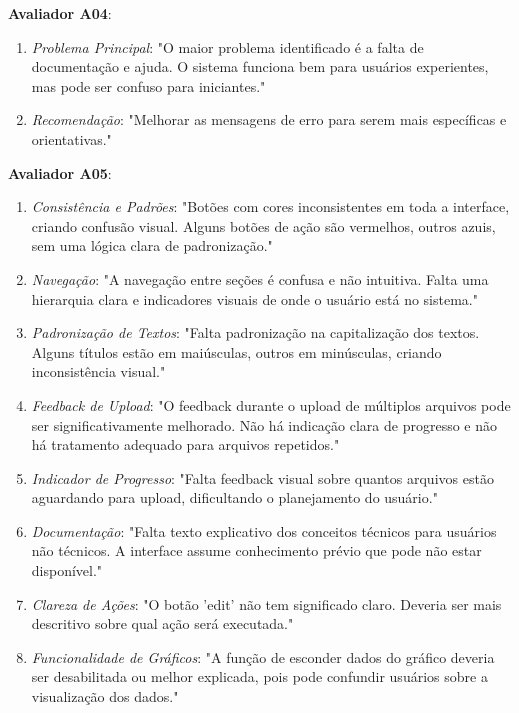 \textbf{Avaliador A04}:
\begin{enumerate}[parsep=0pt,itemsep=0pt]
    \item \textit{Problema Principal}: "O maior problema identificado é a falta de documentação e ajuda. O sistema funciona bem para usuários experientes, mas pode ser confuso para iniciantes."
    \item \textit{Recomendação}: "Melhorar as mensagens de erro para serem mais específicas e orientativas."
\end{enumerate}

\textbf{Avaliador A05}:
\begin{enumerate}[parsep=0pt,itemsep=0pt]
    \item \textit{Consistência e Padrões}: "Botões com cores inconsistentes em toda a interface, criando confusão visual. Alguns botões de ação são vermelhos, outros azuis, sem uma lógica clara de padronização."
    \item \textit{Navegação}: "A navegação entre seções é confusa e não intuitiva. Falta uma hierarquia clara e indicadores visuais de onde o usuário está no sistema."
    \item \textit{Padronização de Textos}: "Falta padronização na capitalização dos textos. Alguns títulos estão em maiúsculas, outros em minúsculas, criando inconsistência visual."
    \item \textit{Feedback de Upload}: "O feedback durante o upload de múltiplos arquivos pode ser significativamente melhorado. Não há indicação clara de progresso e não há tratamento adequado para arquivos repetidos."
    \item \textit{Indicador de Progresso}: "Falta feedback visual sobre quantos arquivos estão aguardando para upload, dificultando o planejamento do usuário."
    \item \textit{Documentação}: "Falta texto explicativo dos conceitos técnicos para usuários não técnicos. A interface assume conhecimento prévio que pode não estar disponível."
    \item \textit{Clareza de Ações}: "O botão 'edit' não tem significado claro. Deveria ser mais descritivo sobre qual ação será executada."
    \item \textit{Funcionalidade de Gráficos}: "A função de esconder dados do gráfico deveria ser desabilitada ou melhor explicada, pois pode confundir usuários sobre a visualização dos dados."
\end{enumerate}



